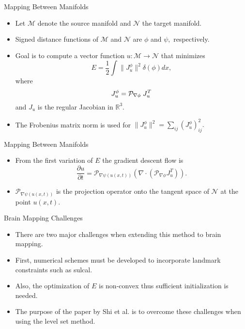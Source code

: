 \documentclass{beamer}
\begin{document}
\begin{frame}{Mapping Between Manifolds}
\begin{itemize}
\item Let $\mathcal{M}$ denote the source manifold and $\mathcal{N}$ the target manifold.
\item Signed distance functions of $\mathcal{M}$ and $\mathcal{N}$ are $\phi$ and $\psi,$ respectively.
\item Goal is to compute a vector function $u : \mathcal{M} \rightarrow \mathcal{N}$ that minimizes $$E=\frac{1}{2} \int \| J_u^{\phi}\|^2 \delta (\phi) dx, $$ where $$J_u^{\phi}=  \mathcal{P}_{\nabla \phi} \hspace{0.1cm} J_u^T$$ and $J_u$ is the regular Jacobian in $\mathbb{R}^3.$
\item The Frobenius matrix norm is used for $\| J_u^{\phi}\|^2 = \sum_{ij} (J_u^{\phi})^2_{ij}.$
\end{itemize}
\end{frame}

\begin{frame}{Mapping Between Manifolds}
\begin{itemize}
\item From the first variation of $E$ the gradient descent flow is $$\frac{\partial u}{\partial t} = \mathcal{P}_{\nabla \psi(u(x,t))} (\nabla \cdot (\mathcal{P}_{\nabla \phi} J_u^T)) .$$
\item $\mathcal{P}_{\nabla \psi(u(x,t))}$ is the projection operator onto the tangent space of $\mathcal{N}$ at the point $u(x,t).$

\end{itemize}
\end{frame}

\begin{frame}{Brain Mapping Challenges}
\begin{itemize}
\item There are two major challenges when extending this method to brain mapping.
\item First, numerical schemes must be developed to incorporate landmark constraints such as sulcal.
\item Also, the optimization of $E$ is non-convex thus sufficient initialization is needed. %
\item The purpose of the paper by Shi et al. is to overcome these challenges when using the level set method.
\end{itemize}
\end{frame}
\end{document}
